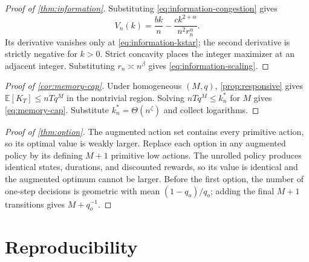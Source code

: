 \documentclass[10pt,twocolumn]{article}
\newcommand{\E}{\mathbb{E}}
\begin{document}
\begin{proof}[Proof of \cref{thm:information}]
Substituting \cref{eq:information-congestion} gives
\[
 V_n(k)=\frac{bk}{n}-\frac{c k^{2+\alpha}}{n^2r_n^\alpha}.
\]
Its derivative vanishes only at \cref{eq:information-kstar}; the second
derivative is strictly negative for $k>0$.  Strict concavity places the integer
maximizer at an adjacent integer.  Substituting $r_n\asymp n^\beta$ gives
\cref{eq:information-scaling}.
\end{proof}

\begin{proof}[Proof of \cref{cor:memory-cap}]
Under homogeneous $(M,q)$, \cref{prop:responsive} gives
$\E[K_T]\le nTq^M$ in the nontrivial region.  Solving
$nTq^M\le k_n^*$ for $M$ gives \cref{eq:memory-cap}.  Substitute
$k_n^*=\Theta(n^\zeta)$ and collect logarithms.
\end{proof}

\begin{proof}[Proof of \cref{thm:option}]
The augmented action set contains every primitive action, so its optimal value
is weakly larger.  Replace each option in any augmented policy by its defining
$M+1$ primitive low actions.  The unrolled policy produces identical states,
durations, and discounted rewards, so its value is identical and the augmented
optimum cannot be larger.  Before the first option, the number of one-step
decisions is geometric with mean $(1-q_o)/q_o$; adding the final $M+1$
transitions gives $M+q_o^{-1}$.
\end{proof}

\section{Reproducibility}
\end{document}
